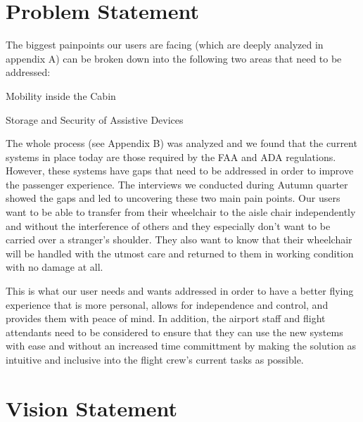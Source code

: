 
\section{Problem Statement}
The biggest painpoints our users are facing (which are deeply analyzed in appendix A) can be broken down into the following two areas that need to be addressed:

\begin{list}{-}{}
  \item Mobility inside the Cabin
  \item Storage and Security of Assistive Devices
\end{list}

The whole process (see Appendix B) was analyzed and  we found that the current systems in place today are those required by the FAA and ADA regulations.  However, these systems have gaps that need to be addressed in order to improve the passenger experience.  The interviews we conducted during Autumn quarter showed the gaps and led to uncovering these two main pain points. Our users want to be able to transfer from their wheelchair to the aisle chair independently and without the interference of others and they especially don't want to be carried over a stranger's shoulder.  They also want to know that their wheelchair will be handled with the utmost care and returned to them in working condition with no damage at all.   

This is what our user needs and wants addressed in order to have a better flying experience that is more personal, allows for independence and control, and provides them with peace of mind. In addition, the airport staff and flight attendants need to be considered to ensure that they can use the new systems with ease and without an increased time committment by making the solution as intuitive and inclusive into the flight crew's current tasks as possible. 


\section{Vision Statement}


